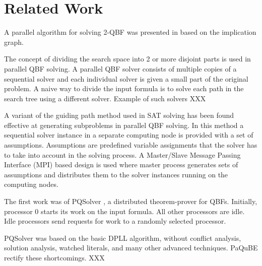 \documentclass[runningheads]{llncs}
\begin{document}
\section{Related Work} \label{sec:related-work}
A parallel algorithm for solving 2-QBF was presented in \cite{AspvallLLS96} based on the implication graph.

The concept of dividing the search space into 2 or more disjoint parts is used in parallel QBF solving. A parallel QBF solver consists of multiple copies of a sequential solver and each individual solver is given a small part of the original problem.
A naive way to divide the input formula is to solve each path in the search tree using a different solver. Example of such solvers XXX

A variant of the guiding path method used in SAT solving
has been found effective at generating subproblems in parallel QBF solving. In this method a sequential solver instance in a separate computing node is provided with a set of assumptions. Assumptions are predefined variable assignments that the solver has to take into account in the solving process. A Master/Slave Message Passing Interface (MPI) based design is used where master process generates sets of assumptions and distributes them to the solver instances running on the computing nodes.

The first work was of PQSolver \cite{FeldmannMS00}, a distributed theorem-prover for QBFs. Initially, processor 0 starts its work on the input formula. All other processors are idle. Idle processors send requests for work to a randomly selected processor. 

PQSolver was based on the basic DPLL algorithm, without conflict analysis, solution analysis, watched literals, and many
other advanced techniques. PaQuBE 
\cite{LewisMSNBG09} rectify these shortcomings. XXX
%

 
 
\end{document}

